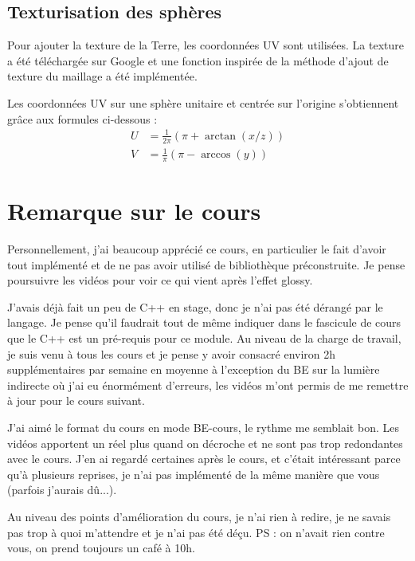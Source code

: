 \documentclass[12pt,a4paper,twoside]{report}
\begin{document}
\subsection{Texturisation des sphères}

Pour ajouter la texture de la Terre, les coordonnées UV sont utilisées. La texture a été téléchargée sur Google et une fonction inspirée de la méthode d'ajout de texture du maillage a été implémentée.

Les coordonnées UV sur une sphère unitaire et centrée sur l'origine s'obtiennent grâce aux formules ci-dessous :
\begin{align}
	U &= \frac{1}{2\pi}\left(\pi + \arctan(x/z)\right)\\
	V &= \frac{1}{\pi}\left(\pi - \arccos(y)\right)
\end{align}

\newpage
\section*{Remarque sur le cours}
\vfill
Personnellement, j'ai beaucoup apprécié ce cours, en particulier le fait d'avoir tout implémenté et de ne pas avoir utilisé de bibliothèque préconstruite. Je pense poursuivre les vidéos pour voir ce qui vient après l'effet glossy.
\vspace{1cm}

J'avais déjà fait un peu de C++ en stage, donc je n'ai pas été dérangé par le langage. Je pense qu'il faudrait tout de même indiquer dans le fascicule de cours que le C++ est un pré-requis pour ce module. Au niveau de la charge de travail, je suis venu à tous les cours et je pense y avoir consacré environ 2h supplémentaires par semaine en moyenne à l'exception du BE sur la lumière indirecte où j'ai eu énormément d'erreurs, les vidéos m'ont permis de me remettre à jour pour le cours suivant.
\vspace{1cm}

J'ai aimé le format du cours en mode BE-cours, le rythme me semblait bon. Les vidéos apportent un réel plus quand on décroche et ne sont pas trop redondantes avec le cours. J'en ai regardé certaines après le cours, et c'était intéressant parce qu'à plusieurs reprises, je n'ai pas implémenté de la même manière que vous (parfois j'aurais dû...).
\vspace{1cm}

Au niveau des points d'amélioration du cours, je n'ai rien à redire, je ne savais pas trop à quoi m'attendre et je n'ai pas été déçu.
\vfill
PS : on n'avait rien contre vous, on prend toujours un café à 10h.
\end{document}
